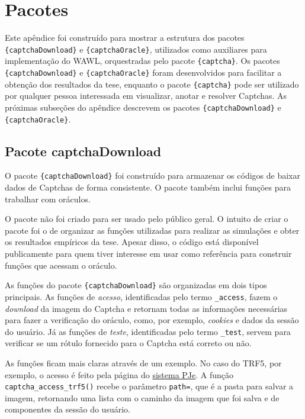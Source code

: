 \documentclass[12pt,twoside,brazilian]{book}
\begin{document}
\appendix
{}

\hypertarget{sec-pacote}{%
\chapter{Pacotes}\label{sec-pacote}}

Este apêndice foi construído para mostrar a estrutura dos pacotes
\texttt{\{captchaDownload\}} e \texttt{\{captchaOracle\}}, utilizados
como auxiliares para implementação do WAWL, orquestradas pelo pacote
\texttt{\{captcha\}}. Os pacotes \texttt{\{captchaDownload\}} e
\texttt{\{captchaOracle\}} foram desenvolvidos para facilitar a obtenção
dos resultados da tese, enquanto o pacote \texttt{\{captcha\}} pode ser
utilizado por qualquer pessoa interessada em visualizar, anotar e
resolver Captchas. As próximas subseções do apêndice descrevem os
pacotes \texttt{\{captchaDownload\}} e \texttt{\{captchaOracle\}}.

\hypertarget{sec-pacote-download}{%
\section{Pacote captchaDownload}\label{sec-pacote-download}}

O pacote \texttt{\{captchaDownload\}} foi construído para armazenar os
códigos de baixar dados de Captchas de forma consistente. O pacote
também inclui funções para trabalhar com oráculos.

O pacote não foi criado para ser usado pelo público geral. O intuito de
criar o pacote foi o de organizar as funções utilizadas para realizar as
simulações e obter os resultados empíricos da tese. Apesar disso, o
código está disponível publicamente para quem tiver interesse em usar
como referência para construir funções que acessam o oráculo.

As funções do pacote \texttt{\{captchaDownload\}} são organizadas em
dois tipos principais. As funções de \emph{acesso}, identificadas pelo
termo \texttt{\_access}, fazem o \emph{download} da imagem do Captcha e
retornam todas as informações necessárias para fazer a verificação do
oráculo, como, por exemplo, \emph{cookies} e dados da sessão do usuário.
Já as funções de \emph{teste}, identificadas pelo termo \texttt{\_test},
servem para verificar se um rótulo fornecido para o Captcha está correto
ou não.

As funções ficam mais claras através de um exemplo. No caso do TRF5, por
exemplo, o acesso é feito pela página do
\href{https://pje.trf5.jus.br/pjeconsulta/ConsultaPublica/listView.seam}{sistema
PJe}. A função \texttt{captcha\_access\_trf5()} recebe o parâmetro
\texttt{path=}, que é a pasta para salvar a imagem, retornando uma lista
com o caminho da imagem que foi salva e de componentes da sessão do
usuário.
\end{document}
